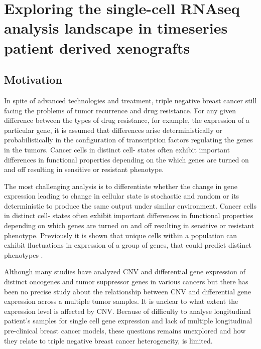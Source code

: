 
{\chapter{Exploring the single-cell RNAseq analysis landscape in timeseries patient derived xenografts}

}
 \label{ch:Chapter5}
 \section{Motivation}

In spite of advanced technologies and treatment, triple negative breast cancer still facing the problems of tumor recurrence and drug resistance.
For any given difference between the types of drug resistance, for example, the expression of a particular gene, it is assumed that differences arise deterministically or probabilistically in the configuration of transcription factors regulating the genes in the tumors. Cancer cells in distinct cell- states often exhibit important differences in functional properties depending on the which genes are turned on and off resulting in sensitive or resistant phenotype.

The most challenging analysis is to differentiate whether the change in gene expression leading to change in cellular state is stochastic\cite{raj2008nature} and random or its deterministic to produce the same output under similar environment.
Cancer cells in distinct cell- states often exhibit important differences in functional properties depending on which genes are turned on and off resulting in sensitive  or resistant phenotype.
Previously it is shown that unique cells within a population can exhibit fluctuations in expression of a group of genes, that could predict distinct phenotypes \cite{shaffer2019memory}.

Although many studies have analyzed CNV and differential gene expression of distinct oncogenes and tumor suppressor genes in various cancers \cite{kuzyk2015mycn, budczies2016pan, kwak2015fibroblast} but there has been no precise study about the relationship between CNV and differential gene expression across a multiple tumor samples. It is unclear to what extent the expression level is affected by CNV.  Because of difficulty to analyse longitudinal patient's samples for single cell gene expression and lack of multiple longitudinal pre-clinical breast cancer models, these questions remains unexplored and how they relate to triple negative breast cancer heterogeneity, is limited.

